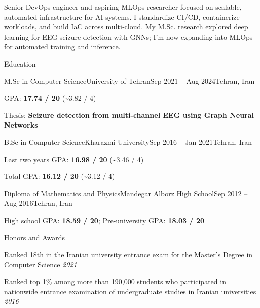 \documentclass[]{main}
\begin{document}
\resumeheader
{\address{Leipzig, Germany}}
{}
{}
{}
{}
{}

Senior DevOps engineer and aspiring MLOps researcher focused on scalable, automated infrastructure for AI systems. I standardize CI/CD, containerize workloads, and build IaC across multi‑cloud. My M.Sc. research explored deep learning for EEG seizure detection with GNNs; I’m now expanding into MLOps for automated training and inference.

\begin{section}{Education}
 \begin{subsectionnobullet}{M.Sc in Computer Science}{University of Tehran}{Sep 2021 -- Aug 2024}{Tehran, Iran}
     \item GPA: \textbf{17.74 / 20} (\textasciitilde{}3.82 / 4)
     \item Thesis: \textbf{Seizure detection from multi-channel EEG using Graph Neural Networks}
 \end{subsectionnobullet}
 \begin{subsectionnobullet}{B.Sc in Computer Science}{Kharazmi University}{Sep 2016 -- Jan 2021}{Tehran, Iran}
     \item Last two years GPA: \textbf{16.98 / 20} (\textasciitilde{}3.46 / 4)
     \item Total GPA: \textbf{16.12 / 20} (\textasciitilde{}3.12 / 4)
 \end{subsectionnobullet}
 \begin{subsectionnobullet}{Diploma of Mathematics and Physics}{Mandegar Alborz High School}{Sep 2012 -- Aug 2016}{Tehran, Iran}
     \item High school GPA: \textbf{18.59 / 20}; Pre-university GPA: \textbf{18.03 / 20}
 \end{subsectionnobullet}
\end{section}

\begin{section}{Honors and Awards}
 \begin{subsectionbullet}
     \item Ranked 18th in the Iranian university entrance exam for the Master's Degree in Computer Science \hfill \textit{2021}
     \item Ranked top 1\% among more than 190,000 students who participated in nationwide entrance examination of undergraduate studies in Iranian universities \hfill \textit{2016}
 \end{subsectionbullet}
\end{section}
\end{document}
